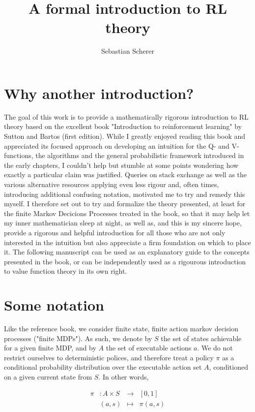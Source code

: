 \documentclass[11pt]{article} %
\title{A formal introduction to RL theory}
\author{Sebastian Scherer}
\begin{document}
\maketitle

\section{Why another introduction?}

The goal of this work is to provide a mathematically rigorous introduction to RL theory based on the excellent book "Introduction to reinforcement learning" by Sutton and Bartos (first edition). While I greatly enjoyed reading this book and appreciated its focused approach on developing an intuition for the Q- and V-functions, the algorithms and the general probabilistic framework introduced in the early chapters, I couldn't help but stumble at some points wondering how exactly a particular claim was justified. Queries on stack exchange as well as the various alternative resources applying even less rigour and, often times, introducing additional confusing notation, motivated me to  try and remedy this myself. I therefore set out to try and formalize the theory presented, at least for the finite Markov Decicions Processes treated in the book, so that it may help let my inner mathematician sleep at night, as well as, and this is my sincere hope, provide a rigorous and helpful introduction for all those who are not only interested in the intuition but also appreciate a firm foundation on which to place it. The following manuscript can be used as an explanatory guide to the concepts presented in the book, or can be independently used as a rigourous introduction to value function theory in its own right.

\section{Some notation}

Like the reference book, we consider finite state, finite action markov decision processes ("finite MDPs"). As such, we denote by $S$ the set of states achievable for a given finite MDP, and by $A$ the set of executable actions $a$. We do not restrict ourselves to deterministic polices, and therefore treat a policy $\pi$ as a conditional probability distribution over the executable action set $A$, conditioned on a given current state from $S$. In other words, 

\begin{equation}
	\begin{array}{llll}\label{ar_polMap}
		\pi 	& : A \times S 	& \to 	& [0,1] \\
			& (a,s)		& \mapsto	& \pi(a,s)
	\end{array}
\end{equation}
\end{document}
